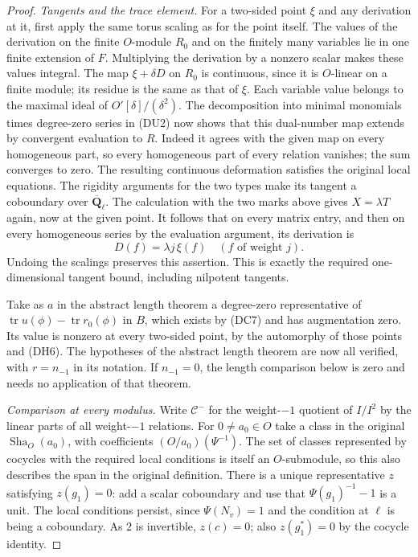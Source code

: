 \begin{proof}
\emph{Tangents and the trace element.}
For a two-sided point $\xi$ and any derivation at it, first
apply the same torus scaling as for the point itself.
The values of the derivation on the finite $O$-module $R_0$
and on the finitely many variables lie in one finite extension
of $F$. Multiplying the derivation by a nonzero scalar makes
these values integral. The map $\xi+\delta D$ on $R_0$ is
continuous, since it is $O$-linear on a finite module; its
residue is the same as that of $\xi$. Each variable value
belongs to the maximal ideal of $O'[\delta]/(\delta^2)$.
The decomposition into minimal monomials times degree-zero
series in (DU2) now shows that this dual-number map extends by
convergent evaluation to $R$. Indeed it agrees with the
given map on every homogeneous part, so every homogeneous
part of every relation vanishes; the sum converges to zero.
The resulting continuous deformation satisfies the original
local equations. The rigidity arguments for the two types make its tangent
a coboundary over $\overline{\mathbf Q}_\ell$.
The calculation with the two marks above gives
$X=\lambda T$ again, now at the given point. It follows that
on every matrix entry, and then on every homogeneous series
by the evaluation argument, its derivation is
\[
                  D(f)=\lambda j\,\xi(f)\quad(f\text{ of weight }j).
\]
Undoing the scalings preserves this assertion. This is exactly
the required one-dimensional tangent bound, including
nilpotent tangents.

Take as $a$ in the abstract length theorem a degree-zero
representative of
$\operatorname{tr}u(\phi)-\operatorname{tr}r_0(\phi)$
in $B$, which exists by (DC7) and has augmentation zero.
Its value is nonzero at every two-sided point, by the
automorphy of those points and (DH6). The hypotheses of the
abstract length theorem are now all verified, with $r=n_{-1}$
in its notation. If $n_{-1}=0$, the length comparison below
is zero and needs no application of that theorem.

\emph{Comparison at every modulus.}
Write $\mathcal C^-$ for the weight-$-1$ quotient of $I/I^2$
by the linear parts of all weight-$-1$ relations. For
$0\ne a_0\in O$ take a class in the original
$\operatorname{Sha}_O(a_0)$, with coefficients
$(O/a_0)(\Psi^{-1})$. The set of classes represented by
cocycles with the required local conditions is itself an
$O$-submodule, so this also describes the span in the original
definition. There is a unique representative $z$ satisfying
$z(g_1)=0$: add a scalar coboundary and use that
$\Psi(g_1)^{-1}-1$ is a unit. The local conditions persist,
since $\Psi(N_v)=1$ and the condition at $\ell$ is being a
coboundary. As $2$ is invertible, $z(c)=0$; also
$z(g_1^*)=0$ by the cocycle identity.


\end{proof}
